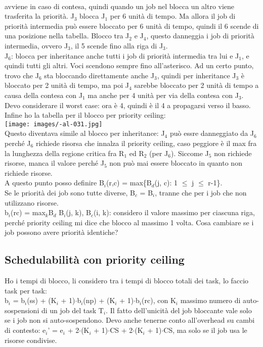 \documentclass{article}
\begin{document}
\\avviene in caso di contesa, quindi quando un job nel blocca un altro viene trasferita la priorità. J$_{3}$ blocca J$_{1}$ per 6 unità di tempo. Ma allora il job di priorità intermedia può essere bloccato per 6 unità di tempo, quindi il 6 scende di una posizione nella tabella. Blocco tra J$_{2}$ e J$_{4}$, questo danneggia i job di priorità intermedia, ovvero J$_{3}$, il 5 scende fino alla riga di J$_{3}$.\\ J$_{6}$: blocca per inheritance anche tutti i job di priorità intermedia tra lui e J$_{1}$, e quindi tutti gli altri. Voci scendono sempre fino all'asterisco. Ad un certo punto, trovo che J$_{6}$ sta bloccando direttamente anche J$_{3}$, quindi per inheritance J$_{3}$ è bloccato per 2 unità di tempo, ma poi J$_{4}$ sarebbe bloccato per 2 unità di tempo a causa della contesa con J$_{1}$ ma anche per 4 unità per via della contesa con J$_{3}$. Devo considerare il worst case: ora è 4, quindi è il 4 a propagarsi verso il basso.\\ Infine ho la tabella per il blocco per priority ceiling:\\
\texttt{[image: images/-al-031.jpg]}\\
Questo diventava simile al blocco per inheritance: J$_{4}$ può essre danneggiato da J$_{6}$ perché J$_{6}$ richiede risorsa che innalza il priority ceiling, caso peggiore è il max fra la lunghezza della regione critica fra R$_{1}$ ed R$_{2}$ (per J$_{6}$). Siccome J$_{5}$ non richiede risorse, manca il valore perché J$_{5}$ non può mai essere bloccato in quanto non richiede risorse.\\ A questo punto posso definire B$_{i}$(r,c) = max\{B$_{d}$(j, c): 1 $\leq$ j $\leq$ r-1\}.\\ Se le priorità dei job sono tutte diverse, B$_{c}$ = B$_{i}$, tranne che per i job che non utilizzano risorse.\\ b$_{i}$(rc) = max$_{k}${B$_{d}$ B$_{i}$(j, k), B$_{c}$(i, k)}: considero il valore massimo per ciascuna riga, perché priority ceiling mi dice che blocco al massimo 1 volta. Cosa cambiare se i job possono avere priorità identiche?
\subsection{Schedulabilità con priority ceiling}
Ho i tempi di blocco, li considero tra i tempi di blocco totali dei task, lo faccio task per task:\\
b$_{i}$ = b$_{i}$(ss) + (K$_{i}$ + 1)$\cdot$b$_{i}$(np) + (K$_{i}$ + 1)$\cdot$b$_{i}$(rc), con K$_{i}$ massimo numero di auto-sospensioni di un job del task T$_{i}$. Il fatto dell'unicità del job bloccante vale solo se i job non si auto-sospendono. Devo anche tenerne conto all'overhead su cambi di contesto: e$_{i}$' = e$_{i}$ + 2$\cdot$(K$_{i}$ + 1)$\cdot$CS + 2$\cdot$(K$_{i}$ + 1)$\cdot$CS, ma solo se il job usa le risorse condivise.
\end{document}
